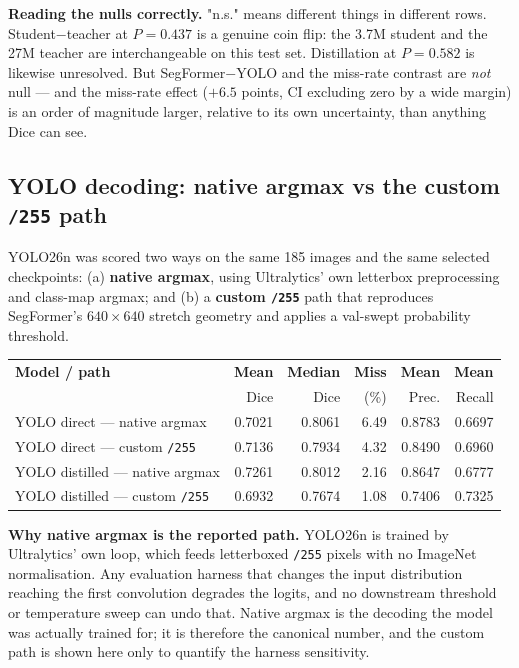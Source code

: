 \documentclass[11pt]{article}
\newcommand{\tabnote}[1]{\par\vspace{2pt}{\footnotesize\itshape #1}\par}
\begin{document}
\tabnote{Rows 1--4 are mean Dice; the last row is percentage points of complete-miss rate.
$P(\Delta>0)$ is one-sided and is reported only alongside the two-sided CI.}

\begin{keybox}
\textbf{Reading the nulls correctly.} "n.s." means different things in different rows.
Student$-$teacher at $P=0.437$ is a genuine coin flip: the 3.7M student and the 27M teacher are
interchangeable on this test set. Distillation at $P=0.582$ is likewise unresolved. But
SegFormer$-$YOLO and the miss-rate contrast are \emph{not} null --- and the miss-rate effect
($+6.5$ points, CI excluding zero by a wide margin) is an order of magnitude larger, relative to
its own uncertainty, than anything Dice can see.
\end{keybox}

\subsection{YOLO decoding: native argmax vs the custom \texttt{/255} path}

YOLO26n was scored two ways on the same 185 images and the same selected checkpoints: (a)
\textbf{native argmax}, using Ultralytics' own letterbox preprocessing and class-map argmax; and
(b) a \textbf{custom \texttt{/255}} path that reproduces SegFormer's $640\times640$ stretch
geometry and applies a val-swept probability threshold.

\begin{center}\small
\begin{tabular}{L n n n n n}
\toprule
\textbf{Model / path} & \textbf{Mean} & \textbf{Median} & \textbf{Miss} & \textbf{Mean} &
\textbf{Mean} \\
 & Dice & Dice & (\%) & Prec. & Recall \\
\midrule
YOLO direct --- native argmax     & 0.7021 & 0.8061 & 6.49 & 0.8783 & 0.6697 \\
YOLO direct --- custom \texttt{/255}   & 0.7136 & 0.7934 & 4.32 & 0.8490 & 0.6960 \\
\addlinespace
YOLO distilled --- native argmax  & 0.7261 & 0.8012 & 2.16 & 0.8647 & 0.6777 \\
YOLO distilled --- custom \texttt{/255} & 0.6932 & 0.7674 & 1.08 & 0.7406 & 0.7325 \\
\bottomrule
\end{tabular}
\end{center}

\textbf{Why native argmax is the reported path.} YOLO26n is trained by Ultralytics' own loop,
which feeds letterboxed \texttt{/255} pixels with no ImageNet normalisation. Any evaluation
harness that changes the input distribution reaching the first convolution degrades the logits,
and no downstream threshold or temperature sweep can undo that. Native argmax is the decoding the
model was actually trained for; it is therefore the canonical number, and the custom path is shown
here only to quantify the harness sensitivity.
\end{document}
